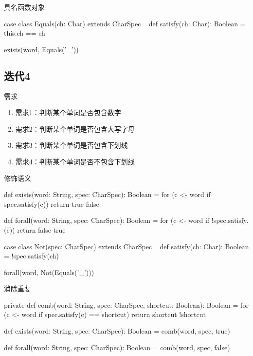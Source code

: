 \begin{frame}[fragile]{具名函数对象}
  \begin{scala}
case class Equals(ch: Char) extends CharSpec {
  def satisfy(ch: Char): Boolean = this.ch == ch
}

exists(word, Equals('_'))
  \end{scala}
\end{frame}

\subsection{迭代4}

\begin{frame}{需求}
  \begin{block}{}
    \begin{enumerate}
    \item \alert{需求1}：判断某个单词是否包含数字
    \item \alert{需求2}：判断某个单词是否包含大写字母
    \item \alert{需求3}：判断某个单词是否包含下划线 
    \item \alert{需求4}：判断某个单词是否不包含下划线     
    \end{enumerate}
  \end{block}
\end{frame}

\begin{frame}[fragile]{修饰语义}
  \begin{scala}
def exists(word: String, spec: CharSpec): Boolean = {
  for (c <- word if spec.satisfy(c))  
    return true
  false
}

def forall(word: String, spec: CharSpec): Boolean = {
  for (c <- word if !spec.satisfy.(c))  
    return false
  true
}

case class Not(spec: CharSpec) extends CharSpec {
  def satisfy(ch: Char): Boolean = !spec.satisfy(ch)
}

forall(word, Not(Equals('_')))
  \end{scala}
\end{frame}

\begin{frame}[fragile]{消除重复}
  \begin{scala}
private def comb(word: String, spec: CharSpec, shortcut: Boolean): Boolean = {
  for (c <- word if spec.satisfy(c) == shortcut) 
    return shortcut
  !shortcut
}

def exists(word: String, spec: CharSpec): Boolean = 
  comb(word, spec, true)

def forall(word: String, spec: CharSpec): Boolean = 
  comb(word, spec, false)
  \end{scala}
\end{frame}

